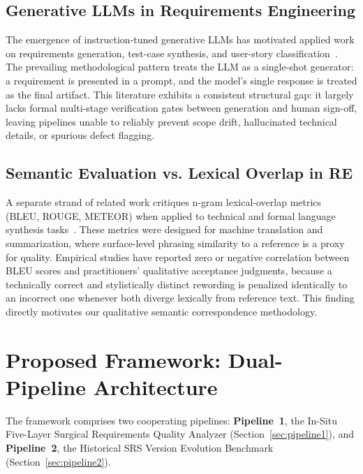 \documentclass[journal]{IEEEtran}
\begin{document}
\subsection{Generative LLMs in Requirements Engineering}
\label{sec:related-llm}

The emergence of instruction-tuned generative LLMs has motivated applied work on requirements generation, test-case synthesis, and user-story classification~\cite{white2023prompt,ronanki2023requirements}. The prevailing methodological pattern treats the LLM as a single-shot generator: a requirement is presented in a prompt, and the model's single response is treated as the final artifact. This literature exhibits a consistent structural gap: it largely lacks formal multi-stage verification gates between generation and human sign-off, leaving pipelines unable to reliably prevent scope drift, hallucinated technical details, or spurious defect flagging.

\subsection{Semantic Evaluation vs. Lexical Overlap in RE}
\label{sec:related-evaluation}

A separate strand of related work critiques n-gram lexical-overlap metrics (BLEU, ROUGE, METEOR) when applied to technical and formal language synthesis tasks~\cite{reiter2018structured,sulem2018bleu}. These metrics were designed for machine translation and summarization, where surface-level phrasing similarity to a reference is a proxy for quality. Empirical studies have reported zero or negative correlation between BLEU scores and practitioners' qualitative acceptance judgments, because a technically correct and stylistically distinct rewording is penalized identically to an incorrect one whenever both diverge lexically from reference text. This finding directly motivates our qualitative semantic correspondence methodology.

\section{Proposed Framework: Dual-Pipeline Architecture}
\label{sec:proposed-framework}

The framework comprises two cooperating pipelines: \textbf{Pipeline~1}, the In-Situ Five-Layer Surgical Requirements Quality Analyzer (Section~\ref{sec:pipeline1}), and \textbf{Pipeline~2}, the Historical SRS Version Evolution Benchmark (Section~\ref{sec:pipeline2}).
\end{document}
